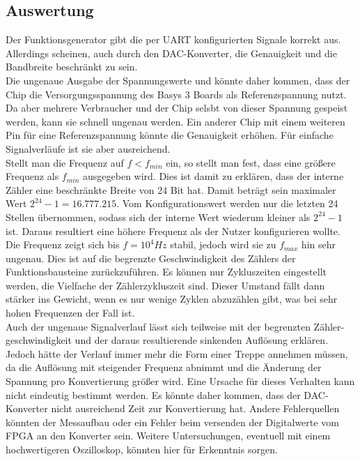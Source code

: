 \subsection{Auswertung}
Der Funktionsgenerator gibt die per UART konfigurierten Signale korrekt aus. 
Allerdings scheinen, auch durch den DAC-Konverter, die Genauigkeit und die Bandbreite beschränkt zu sein. \\
Die ungenaue Ausgabe der Spannungswerte  und  könnte daher kommen, dass der Chip die Versorgungsspannung des Basys 3 Boards als Referenzspannung nutzt.
Da aber mehrere Verbraucher und der Chip selsbt von dieser Spannung gespeist werden, kann sie schnell ungenau werden.
Ein anderer Chip mit einem weiteren Pin für eine Referenzspannung könnte die Genauigkeit erhöhen.
Für einfache Signalverläufe ist sie aber ausreichend. \\
Stellt man die Frequenz auf $f < f_{min}$ ein, so stellt man fest, dass eine größere Frequenz als $f_{min}$ ausgegeben wird.
Dies ist damit zu erklären, dass der interne Zähler eine beschränkte Breite von 24 Bit hat.
Damit beträgt sein maximaler Wert $2^{24} - 1 = 16.777.215$.
Vom Konfigurationswert werden nur die letzten 24 Stellen übernommen, sodass sich der interne Wert wiederum kleiner als $2^{24} - 1$ ist.
Daraus resultiert eine höhere Frequenz als der Nutzer konfigurieren wollte.\\
Die Frequenz zeigt sich bis $f = 10^4 Hz$ stabil, jedoch wird sie zu $f_{max}$ hin sehr ungenau.
Dies ist auf die begrenzte Geschwindigkeit des Zählers der Funktionsbausteine zurückzuführen.
Es können nur Zykluszeiten eingestellt werden, die Vielfache der Zählerzykluszeit sind.
Dieser Umstand fällt dann stärker ins Gewicht, wenn es nur wenige Zyklen abzuzählen gibt, was bei sehr hohen Frequenzen der Fall ist. \\
Auch der ungenaue Signalverlauf lässt sich teilweise mit der begrenzten Zähler-geschwindigkeit und der daraus resultierende sinkenden Auflösung erklären.
Jedoch hätte der Verlauf immer mehr die Form einer Treppe annehmen müssen, da die Auflösung mit steigender Frequenz abnimmt und die Änderung der Spannung pro Konvertierung größer wird.
Eine Ursache für dieses Verhalten kann nicht eindeutig bestimmt werden.
Es könnte daher kommen, dass der DAC-Konverter nicht ausreichend Zeit zur Konvertierung hat.
Andere Fehlerquellen könnten der Messaufbau oder ein Fehler beim versenden der Digitalwerte vom FPGA an den Konverter sein.
Weitere Untersuchungen, eventuell mit einem hochwertigeren Oszilloskop, könnten hier für Erkenntnis sorgen.
